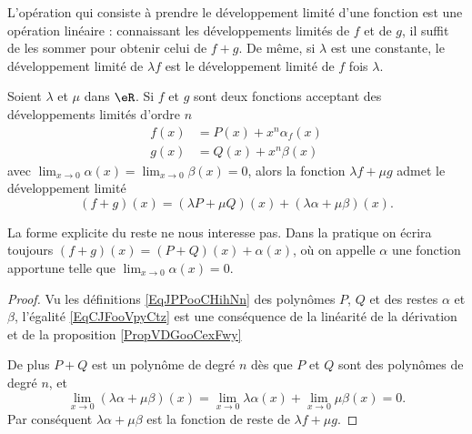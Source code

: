L'opération qui consiste à prendre le développement limité d'une fonction est une opération linéaire : connaissant les développements limités de \( f\) et de \( g\), il suffit de les sommer pour obtenir celui de \( f+g\). De m\^eme, si $\lambda$ est une constante, le développement limité de $\lambda f$ est le développement limité de $f$ fois $\lambda$. 
\begin{proposition}
Soient $\lambda$ et $\mu$ dans $\eR$.  Si \( f\) et \( g\) sont deux fonctions acceptant des développements limités d'ordre \( n\)
    \begin{subequations}    \label{EqJPPooCHihNn}
        \begin{align}
            f(x)&=P(x)+x^n\alpha_f(x)\\
            g(x)&=Q(x)+x^n\beta(x)
        \end{align}
    \end{subequations}
    avec \( \lim_{x\to 0} \alpha(x)=\lim_{x\to 0} \beta(x)=0\), alors la fonction \( \lambda f+\mu g\) admet le développement limité
    \begin{equation}    \label{EqCJFooVpyCtz}
        (f+g)(x)=(\lambda P+\mu Q)(x)+(\lambda \alpha+\mu\beta)(x).
    \end{equation}
\end{proposition}
\begin{remark}
  La forme explicite du reste ne nous interesse pas. Dans la pratique on écrira toujours $(f+g)(x)=(P+Q)(x)+\alpha(x)$, où on appelle $\alpha$ une fonction apportune telle que $\lim_{x\to 0} \alpha(x)=0$.
\end{remark}
\begin{proof}
    Vu les définitions \eqref{EqJPPooCHihNn} des polynômes \( P\), \( Q\) et des restes \( \alpha\) et \( \beta\), l'égalité \eqref{EqCJFooVpyCtz} est une conséquence de la linéarité de la dérivation et de la proposition \ref{PropVDGooCexFwy}

    De plus \( P+Q\) est un polynôme de degré \( n\) dès que \( P\) et \( Q\) sont des polynômes de degré \( n\), et
    \begin{equation}
        \lim_{x\to 0} (\lambda \alpha+\mu\beta)(x)=\lim_{x\to 0} \lambda\alpha(x)+\lim_{x\to 0} \mu\beta(x)=0.
    \end{equation}
    Par conséquent \(\lambda \alpha+\mu\beta\) est la fonction de reste de \( \lambda f+\mu g\).
\end{proof}

